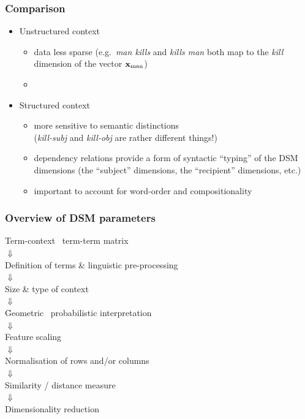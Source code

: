 \documentclass[t]{beamer} %
\begin{document}
\begin{frame}
  \frametitle{Comparison}

  \begin{itemize}
  \item Unstructured context
    \begin{itemize}
    \item data less sparse (e.g.\ \emph{man kills} and \emph{kills man} both
      map to the \emph{kill} dimension of the vector $\vx_{\text{man}}$)
    \item[]
    \end{itemize}
  \item Structured context
    \begin{itemize}
    \item more sensitive to semantic distinctions\\
      (\emph{kill-subj} and \emph{kill-obj} are rather different
      things!)
    \item dependency relations provide a form of syntactic ``typing''
      of the DSM dimensions (the ``subject'' dimensions, the
      ``recipient'' dimensions, etc.)
     \item important to account for word-order and compositionality 
    \end{itemize}
  \end{itemize}
\end{frame}

\begin{frame}
  \frametitle{Overview of DSM parameters}

  \ungap[1]
  \begin{center}
    Term-context \vs\ term-term matrix\\
    $\Downarrow$\\
    Definition of terms \& linguistic pre-processing\\
    $\Downarrow$\\
    Size \& type of context\\
    $\Downarrow$\\
    \h{Geometric \vs\ probabilistic interpretation}\\
    $\Downarrow$\\
    Feature scaling\\
    $\Downarrow$\\
    Normalisation of rows and/or columns\\
    $\Downarrow$\\
    Similarity / distance measure\\
    $\Downarrow$\\
    Dimensionality reduction
  \end{center}
\end{frame}
\end{document}
